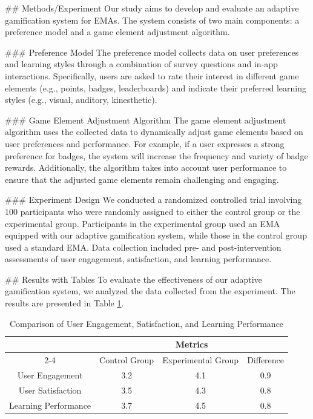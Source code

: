 ## Methods/Experiment
Our study aims to develop and evaluate an adaptive gamification system for EMAs. The system consists of two main components: a preference model and a game element adjustment algorithm. 

### Preference Model
The preference model collects data on user preferences and learning styles through a combination of survey questions and in-app interactions. Specifically, users are asked to rate their interest in different game elements (e.g., points, badges, leaderboards) and indicate their preferred learning styles (e.g., visual, auditory, kinesthetic).

### Game Element Adjustment Algorithm
The game element adjustment algorithm uses the collected data to dynamically adjust game elements based on user preferences and performance. For example, if a user expresses a strong preference for badges, the system will increase the frequency and variety of badge rewards. Additionally, the algorithm takes into account user performance to ensure that the adjusted game elements remain challenging and engaging.

### Experiment Design
We conducted a randomized controlled trial involving 100 participants who were randomly assigned to either the control group or the experimental group. Participants in the experimental group used an EMA equipped with our adaptive gamification system, while those in the control group used a standard EMA. Data collection included pre- and post-intervention assessments of user engagement, satisfaction, and learning performance.

## Results with Tables
To evaluate the effectiveness of our adaptive gamification system, we analyzed the data collected from the experiment. The results are presented in Table \ref{tab:results}.

\begin{table}[ht]
\centering
\caption{Comparison of User Engagement, Satisfaction, and Learning Performance}
\label{tab:results}
\begin{tabular}{|c|c|c|c|}
\hline
& \multicolumn{3}{c|}{Metrics} \\
\cline{2-4}
& Control Group & Experimental Group & Difference \\
\hline
User Engagement & 3.2 & 4.1 & 0.9 \\
User Satisfaction & 3.5 & 4.3 & 0.8 \\
Learning Performance & 3.7 & 4.5 & 0.8 \\
\hline
\end{tabular}
\end{table}

